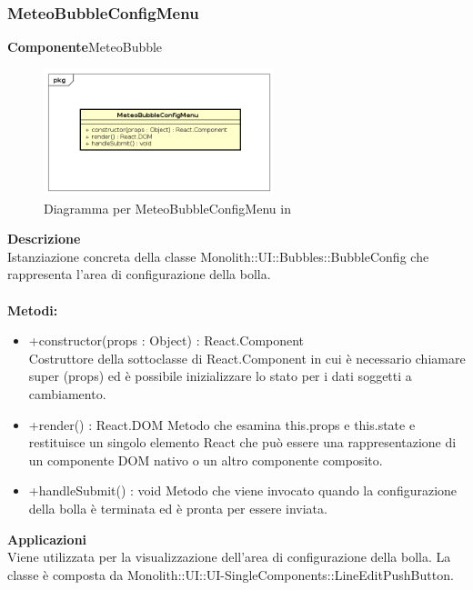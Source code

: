 \subsubsection{MeteoBubbleConfigMenu}
\textbf{Componente}MeteoBubble\\
   \FloatBarrier
   \begin{figure}[ht]
   \centering
   \includegraphics[width=0.6\textwidth]{img/single-MeteoBubbleConfigMenu}
   \caption{{Diagramma per MeteoBubbleConfigMenu in }}
\end{figure}
\FloatBarrier
\textbf{Descrizione}\\
Istanziazione concreta della classe Monolith::UI::Bubbles::BubbleConfig che rappresenta l'area di configurazione della bolla. 
\\
\\
\textbf{Metodi:} 
\begin{itemize}
\item +constructor(props : Object) : React.Component 
\\
Costruttore della sottoclasse di React.Component in cui è necessario chiamare super (props) ed è possibile inizializzare lo stato per i dati soggetti a cambiamento.

\item +render() : React.DOM
Metodo che esamina this.props e this.state e restituisce un singolo elemento React che può essere una rappresentazione di un componente DOM nativo o un altro componente composito.

\item +handleSubmit() : void
Metodo che viene invocato quando la configurazione della bolla è terminata ed è pronta per essere inviata.

\end{itemize} 


\textbf{Applicazioni}\\
Viene utilizzata per la visualizzazione dell'area di configurazione della bolla. 
La classe è composta da Monolith::UI::UI-SingleComponents::LineEditPushButton. 


\clearpage

